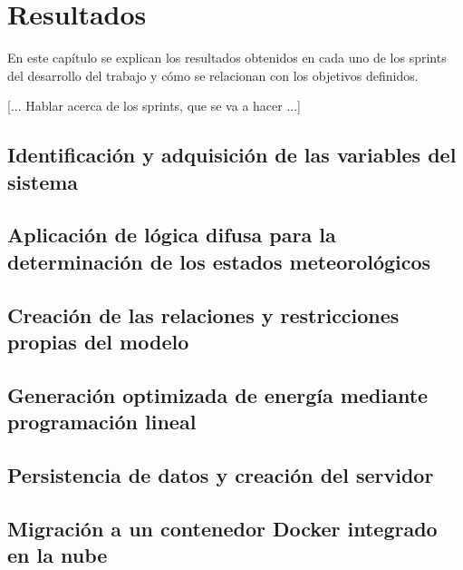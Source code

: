 \chapter{Resultados}
\label{cap:Resultados}
En este capítulo se explican los resultados obtenidos en cada uno de los sprints del desarrollo del trabajo y cómo se relacionan con los objetivos definidos.


[... Hablar acerca de los sprints, que se va a hacer ...]
\section{Identificación y adquisición de las variables del sistema}

\section{Aplicación de lógica difusa para la determinación de los estados meteorológicos}

\section{Creación de las relaciones y restricciones propias del modelo}

\section{Generación optimizada de energía mediante programación lineal}

\section{Persistencia de datos y creación del servidor}
\section{Migración a un contenedor Docker integrado en la nube}
